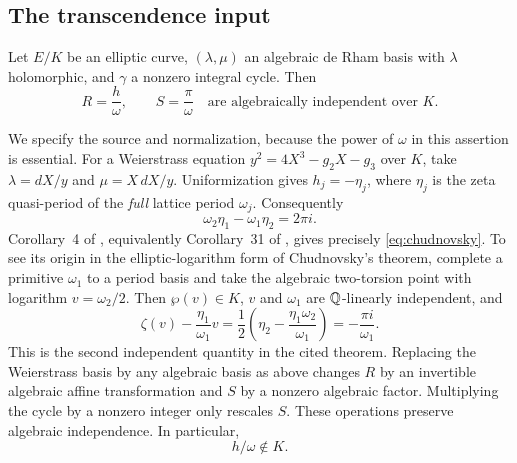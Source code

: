 \subsection{The transcendence input}
\begin{theorem}[Chudnovsky]\label{thm:B-chudnovsky}
Let $E/K$ be an elliptic curve, $(\lambda,\mu)$ an algebraic de Rham
basis with $\lambda$ holomorphic, and $\gamma$ a nonzero integral
cycle. Then
\begin{equation}\label{eq:chudnovsky}
 R=\frac h\omega,\qquad S=\frac\pi\omega
 \quad\text{are algebraically independent over }K.
\end{equation}
\end{theorem}
We specify the source and normalization, because the power of
$\omega$ in this assertion is essential. For a Weierstrass equation
$y^2=4X^3-g_2X-g_3$ over $K$, take $\lambda=dX/y$ and
$\mu=X\,dX/y$. Uniformization gives $h_j=-\eta_j$, where $\eta_j$
is the zeta quasi-period of the \emph{full} lattice period $\omega_j$.
Consequently
\begin{equation}\label{eq:B-legendre-convention}
 \omega_2\eta_1-\omega_1\eta_2=2\pi i.
\end{equation}
Corollary~4 of \cite{Waldschmidt}, equivalently Corollary~31 of
\cite[p.~166]{WaldschmidtSurvey}, gives precisely
\eqref{eq:chudnovsky}. To see its origin in the elliptic-logarithm
form of Chudnovsky's theorem, complete a primitive $\omega_1$ to a
period basis and take the algebraic two-torsion point with logarithm
$v=\omega_2/2$. Then $\wp(v)\in K$, $v$ and $\omega_1$ are
$\mathbb Q$-linearly independent, and
\[
 \zeta(v)-\frac{\eta_1}{\omega_1}v
   =\frac12\left(\eta_2-\frac{\eta_1\omega_2}{\omega_1}\right)
   =-\frac{\pi i}{\omega_1}.
\]
This is the second independent quantity in the cited theorem.
Replacing the Weierstrass basis by any algebraic basis as above
changes $R$ by an invertible algebraic affine transformation and $S$
by a nonzero algebraic factor. Multiplying the cycle by a nonzero
integer only rescales $S$. These operations preserve algebraic
independence. In particular,
\begin{equation}\label{eq:general-ratio-transcendence}
                         h/\omega\notin K.
\end{equation}

